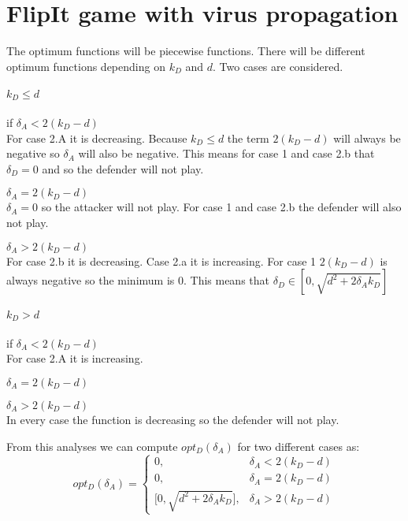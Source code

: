 \chapter{FlipIt game with virus propagation}
\label{chapter2:FlipIt with virus propagation}
%

The optimum functions will be piecewise functions. There will be different optimum functions depending on $k_{D}$ and $d$. Two cases are considered.
\subsubsection{$k_{D} \leq d$}

\begin{description}
\item if $\delta_{A} < 2(k_{D} - d)$ \\
For case 2.A it is decreasing. Because $k_{D} \leq d$ the term $2(k_{D} - d)$ will always be negative so $\delta_{A}$ will also be negative. This means for case 1 and case 2.b that $\delta_{D} = 0$ and so the defender will not play.
\item $\delta_{A} = 2(k_{D} - d)$ \\
$\delta_{A} = 0$ so the attacker will not play. For case 1 and case 2.b the defender will also not play.
\item $\delta_{A} > 2(k_{D} - d)$ \\
For case 2.b it is decreasing. Case 2.a it is increasing. For case 1 $2(k_{D} - d)$ is always negative so the minimum is 0. This means that $\delta_{D} \in [0, \sqrt{d^{2} + 2\delta_{A}k_{D}}]$
\end{description}

\subsubsection{$k_{D} > d$}
\begin{description}
\item if $\delta_{A} < 2(k_{D} - d)$ \\
For case 2.A it is increasing. 
\item $\delta_{A} = 2(k_{D} - d)$ \\
\item $\delta_{A} > 2(k_{D} - d)$ \\
In every case the function is decreasing so the defender will not play.
\end{description}

From this analyses we can compute $opt_{D}(\delta_{A})$ for two different cases as:
 \begin{displaymath}
  opt_{D}(\delta_{A}) = \left\{
     \begin{array}{lr}
       0, & \delta_{A} < 2(k_{D} - d)\\
       0, & \delta_{A} = 2(k_{D} - d) \\
       \big[0,\sqrt{d^{2} + 2\delta_{A}k_{D}}\big], & \delta_{A} > 2(k_{D} - d)
     \end{array}
   \right.
\end{displaymath}

